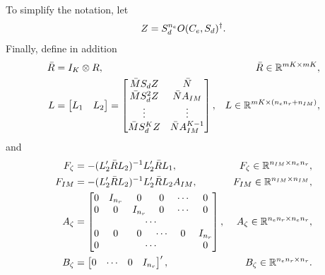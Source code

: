 To simplify the notation, let
\begin{equation}
  \label{eq:sdall_Z}
  Z = S_d^{{n_e}}O(C_e,S_d)^\dagger.
\end{equation}
Finally, define in addition
\begin{subequations}
  \label{eq:sdall_bigl_zetass_ssoptgains1}
  \begin{align}
    \bar{R} &= I_K\otimes R, & \bar{R}\in\mathbb{R}^{m K \times m K},\\
    L &= \begin{bmatrix} L_1 & L_2 \end{bmatrix} = \begin{bmatrix}
      \bar{M} S_d Z & \bar{N} \\
      \bar{M} S_d^{2} Z & \bar{N} A_{IM} \\
      \vdots & \vdots \\
      \bar{M} S_d^{K} Z & \bar{N} A^{K-1}_{IM}
      \end{bmatrix}, & L\in\mathbb{R}^{m K \times ({n_e}{n_r} + n_{IM})},\label{eq:sdall_bigl}
  \end{align}
\end{subequations}
and
\begin{subequations}
  \label{eq:sdall_bigl_zetass_ssoptgains2}
  \begin{align}
    F_{\zeta} &= -(L_2'\bar{R}L_2)^{-1}L_2'\bar{R}L_1, & F_{\zeta}\in\R^{n_{IM}\times\bbexostatedim\bbrefdim},\label{eq:sdall_fxi}\\
    F_{IM} &= -(L_2'\bar{R}L_2)^{-1}L_2'\bar{R}L_2A_{IM}, & F_{IM}\in\R^{n_{IM}\times n_{IM}},\label{eq:sdall_fim}\\
    A_{\zeta} &= \begin{bmatrix}
      0 & I_{\bbrefdim} & 0 & 0 & \cdots & 0 \\
      0 & 0 & I_{\bbrefdim} & 0 & \cdots & 0 \\
      &&& \hspace{-22pt}\cdots \\
      0 & 0 & 0 & \cdots & 0 & I_{\bbrefdim} \\
      0 &&& \hspace{-22pt}\cdots && 0
      \end{bmatrix}, & A_{\zeta}\in\R^{\bbexostatedim\bbrefdim\times\bbexostatedim\bbrefdim},\label{eq:sdall_azeta}\\
    B_{\zeta} &= \begin{bmatrix} 0 & \cdots & 0 & I_{\bbrefdim}\end{bmatrix}', & B_{\zeta}\in\R^{\bbexostatedim\bbrefdim\times\bbrefdim}.\label{eq:sdall_bzeta}
  \end{align}
\end{subequations}

